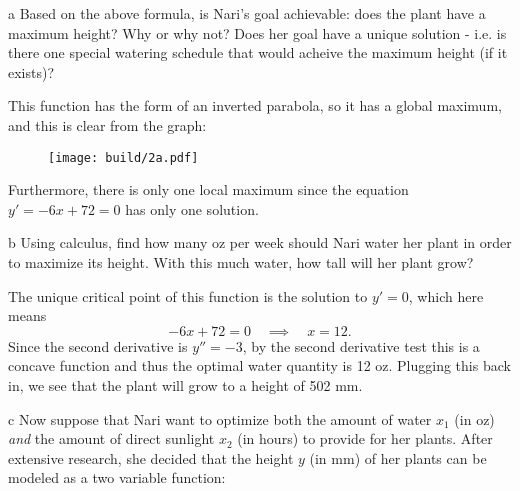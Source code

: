 \documentclass[expanded]{pset}
\begin{document}
\begin{parts}
  \begin{part}{a}
    Based on the above formula, is Nari's goal achievable: does the plant have a maximum height? Why or why not? Does her goal have a unique solution - i.e. is there one special watering schedule that would acheive the maximum height (if it exists)?

  \end{part}

  This function has the form of an inverted parabola, so it has a global maximum, and this is clear from the graph:

  \begin{figure}[ht]
    \centering
    \texttt{[image: build/2a.pdf]}
  \end{figure}\noindent
  Furthermore, there is only one local maximum since the equation $y'=-6x+72=0$ has only one solution.

  \begin{part}{b}
    Using calculus, find how many oz per week should Nari water her plant in order to maximize its height. With this much water, how tall will her plant grow?

  \end{part}

  The unique critical point of this function is the solution to $y'=0$, which here means
  \[
    -6x+72 = 0 \quad\implies \quad x = 12.
  \]
  Since the second derivative is $y''=-3$, by the second derivative test this is a concave function and 
  thus the optimal water quantity is 12 oz. Plugging this back in, we see that the plant will grow to a height of 502 mm.

  \begin{part}{c}
    Now suppose that Nari want to optimize both the amount of water $x_1$ (in oz) \textit{and} the amount of direct sunlight $x_2$ (in hours) to provide for her plants. After extensive research, she decided that the height $y$ (in mm) of her plants can be modeled as a two variable function:


\end{part}
\end{parts}
\end{document}
